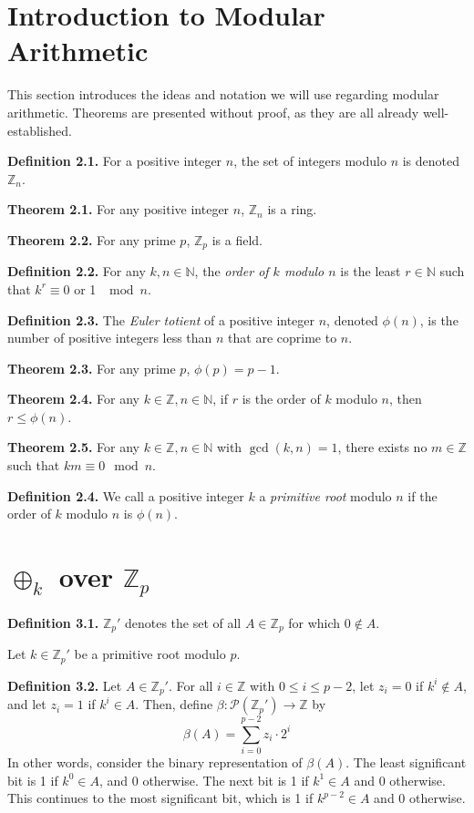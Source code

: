 \documentclass{article}
\newcommand{\zee}{\mathbb{Z}}
\newcommand{\N}{\mathbb{N}}
\begin{document}
\section{Introduction to Modular Arithmetic}

This section introduces the ideas and notation we will use regarding
modular arithmetic.
Theorems are presented without proof,
as they are all already well-established.

\textbf{Definition 2.1.} For a positive integer $n$, the set of integers
modulo $n$ is denoted $\zee_n$.

\textbf{Theorem 2.1.} For any positive integer $n$, $\zee_n$ is a ring.

\textbf{Theorem 2.2.} For any prime $p$, $\zee_p$ is a field.

\textbf{Definition 2.2.} For any $k, n \in \N$, the \textit{order
of $k$ modulo $n$} is the least $r \in \N$ such that
$k^r \equiv 0$ or 1 $\mod n$.

\textbf{Definition 2.3.} The \textit{Euler totient} of a
positive integer $n$,
denoted $\phi(n)$, is the number of positive integers less than $n$
that are coprime to $n$.

\textbf{Theorem 2.3.} For any prime $p$, $\phi(p) = p - 1$.

\textbf{Theorem 2.4.} For any $k \in \zee, n \in \N$, if $r$ is the order of
$k$ modulo $n$, then $r \leq \phi(n)$.

\textbf{Theorem 2.5.} For any $k \in \zee, n \in \N$ with
$\gcd(k, n) = 1$, there exists no $m \in \zee$ such that
$km \equiv 0 \mod n$.

\textbf{Definition 2.4.} We call a positive integer $k$ a
\textit{primitive root} modulo $n$ if the order of $k$ modulo $n$
is $\phi(n)$.

\section{$\oplus_k$ over $\zee_p$}

\textbf{Definition 3.1.} $\zee_p'$ denotes the set of all
$A \in \zee_p$ for which $0 \not\in A$.

Let $k \in \zee_p'$ be a primitive root modulo $p$.

\textbf{Definition 3.2.} Let $A \in \zee_p'$. For all $i \in \zee$
with $0 \leq i \leq p - 2$, let $z_i = 0$ if $k^i \not\in A$,
and let $z_i = 1$ if $k^i \in A$. Then, define
$\beta: \mathcal{P}(\zee_p') \rightarrow \zee$ by
\[\beta(A) = \sum_{i = 0}^{p-2} z_i \cdot 2^{i}\]
In other words, consider the binary representation of $\beta(A)$.
The least significant bit is 1 if $k^0 \in A$, and 0 otherwise.
The next bit is 1 if $k^1 \in A$ and 0 otherwise.
This continues to the most significant bit,
which is 1 if $k^{p-2} \in A$ and 0 otherwise.
\end{document}
